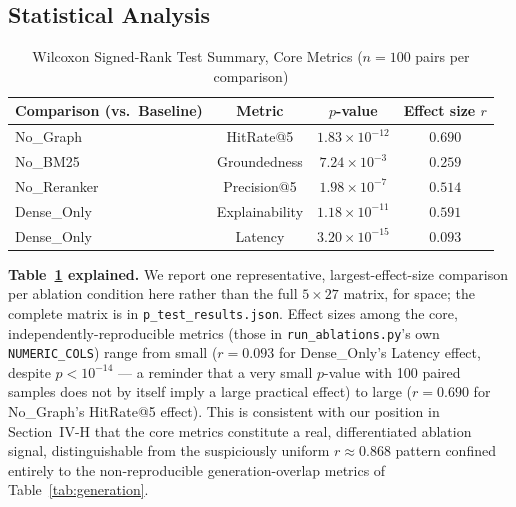 \documentclass[conference]{IEEEtran}
\begin{document}
\subsection{Statistical Analysis}

\begin{table}[t]
\centering
\caption{Wilcoxon Signed-Rank Test Summary, Core Metrics ($n=100$ pairs per comparison)}
\label{tab:stats}
\begin{tabular}{@{}lccc@{}}
\toprule
\textbf{Comparison (vs.\ Baseline)} & \textbf{Metric} & \textbf{$p$-value} & \textbf{Effect size $r$} \\
\midrule
No\_Graph    & HitRate@5        & $1.83\times10^{-12}$ & $0.690$ \\
No\_BM25     & Groundedness     & $7.24\times10^{-3}$  & $0.259$ \\
No\_Reranker & Precision@5      & $1.98\times10^{-7}$  & $0.514$ \\
Dense\_Only  & Explainability   & $1.18\times10^{-11}$ & $0.591$ \\
Dense\_Only  & Latency          & $3.20\times10^{-15}$ & $0.093$ \\
\bottomrule
\end{tabular}
\end{table}

\textbf{Table~\ref{tab:stats} explained.} We report one representative, largest-effect-size comparison per ablation condition here rather than the full $5\times27$ matrix, for space; the complete matrix is in \texttt{p\_test\_results.json}. Effect sizes among the core, independently-reproducible metrics (those in \texttt{run\_ablations.py}'s own \texttt{NUMERIC\_COLS}) range from small ($r=0.093$ for Dense\_Only's Latency effect, despite $p<10^{-14}$ --- a reminder that a very small $p$-value with 100 paired samples does not by itself imply a large practical effect) to large ($r=0.690$ for No\_Graph's HitRate@5 effect). This is consistent with our position in Section~IV-H that the core metrics constitute a real, differentiated ablation signal, distinguishable from the suspiciously uniform $r\approx0.868$ pattern confined entirely to the non-reproducible generation-overlap metrics of Table~\ref{tab:generation}.
\end{document}
